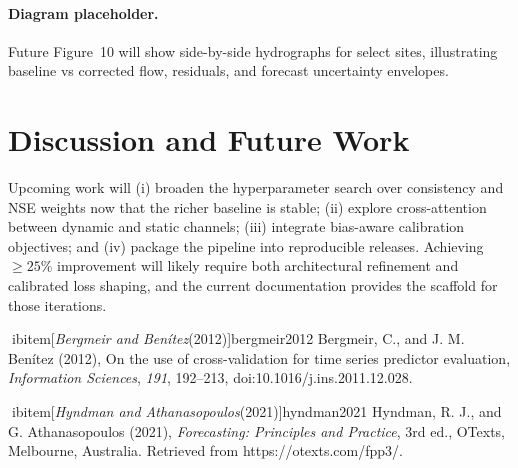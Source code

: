 \documentclass[draft]{agujournal2019}
\begin{document}
\paragraph{Diagram placeholder.} Future Figure~10 will show side-by-side hydrographs for select sites, illustrating baseline vs corrected flow, residuals, and forecast uncertainty envelopes.

\section{Discussion and Future Work}
Upcoming work will (i) broaden the hyperparameter search over consistency and NSE weights now that the richer baseline is stable; (ii) explore cross-attention between dynamic and static channels; (iii) integrate bias-aware calibration objectives; and (iv) package the pipeline into reproducible releases. Achieving \(\geq 25\%\) improvement will likely require both architectural refinement and calibrated loss shaping, and the current documentation provides the scaffold for those iterations.

\begin{thebibliography}{99}
ibitem[\textit{Bergmeir and Ben\'{i}tez}(2012)]{bergmeir2012} Bergmeir, C., and J. M. Ben\'{i}tez (2012), On the use of cross-validation for time series predictor evaluation, \textit{Information Sciences}, \textit{191}, 192--213, doi:10.1016/j.ins.2011.12.028.

ibitem[\textit{Hyndman and Athanasopoulos}(2021)]{hyndman2021} Hyndman, R. J., and G. Athanasopoulos (2021), \textit{Forecasting: Principles and Practice}, 3rd ed., OTexts, Melbourne, Australia. Retrieved from https://otexts.com/fpp3/.
\end{thebibliography}
\end{document}

